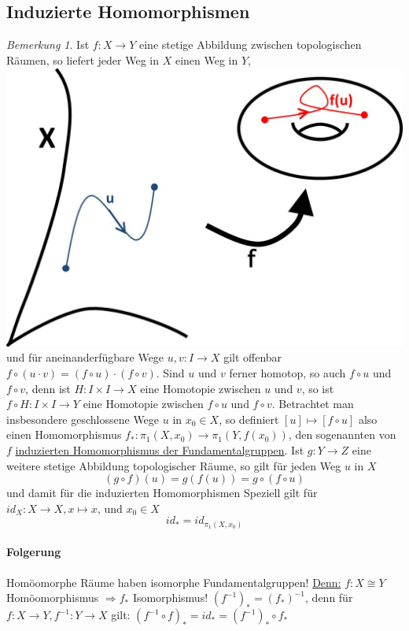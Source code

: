 \documentclass[a4paper,11pt,notitlepage]{report}
\theoremstyle{remark}
\newtheorem{remark}{Bemerkung}[chapter]
\theoremstyle{definition}
\begin{document}
\subsection{Induzierte Homomorphismen}
\begin{remark}
	Ist $f \colon X \rightarrow Y$ eine stetige Abbildung zwischen topologischen Räumen, so liefert jeder Weg in $X$ einen Weg in $Y$, \includegraphics[scale=0.4]{images/Weg_stetige_Abbildung.jpg} und für aneinanderfügbare Wege $u,v \colon I \rightarrow X$ gilt offenbar $f \circ (u \cdot v) = (f \circ u) \cdot (f \circ v)$.
	\newline
	Sind $u$ und $v$ ferner homotop, so auch $f \circ u$ und $f \circ v$, denn ist $H \colon I \times I \rightarrow X$ eine Homotopie zwischen $u$ und $v$, so ist $f \circ H \colon I \times I \rightarrow Y$ eine Homotopie zwischen $f \circ u$ und $f \circ v$.
	\newline
	Betrachtet man insbesondere geschlossene Wege $u$ in $x_0 \in X$, so definiert $[u] \mapsto [f \circ u]$ also einen Homomorphismus $f_* \colon \pi_1(X,x_0) \rightarrow \pi_1(Y, f(x_0))$, den sogenannten von $f$ \underline{induzierten Homomorphismus der Fundamentalgruppen}.
	\newline
	Ist $g \colon Y \rightarrow Z$ eine weitere stetige Abbildung topologischer Räume, so gilt für jeden Weg $u$ in $X$
	$$(g \circ f) (u) = g(f(u)) = g \circ (f \circ u)$$
	und damit für die induzierten Homomorphismen 
	 \newline
	Speziell gilt für $id_X \colon X \rightarrow X, x \mapsto x$, und $x_0 \in X$
	$$id_* = id_{\pi_1(X,x_0)}$$
	
	\paragraph{Folgerung} Homöomorphe Räume haben isomorphe Fundamentalgruppen!
	\underline{Denn:} $f \colon X \cong Y$ Homöomorphismus $\Rightarrow f_*$ Isomorphismus!
	\newline
	$(f^{-1})_*=(f_*)^{-1}$, denn für
	$f \colon X \rightarrow Y, f^{-1} \colon Y \rightarrow X$ gilt:\newline
	$(f^{-1} \circ f)_* = id_* = (f^{-1})_* \circ f_*$
\end{remark}
\end{document}

